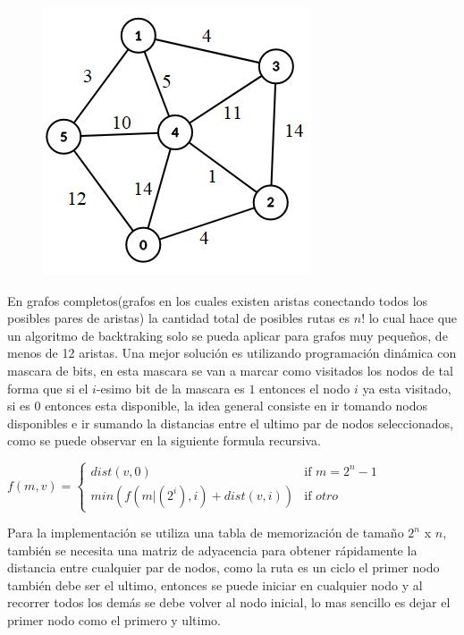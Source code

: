\documentclass[12pt, a4paper]{article}
\begin{document}
	\begin{figure}[!htb]
		\centering
		\includegraphics[scale=0.9]{Programacion_dinamica/imagenes/TSP/ejemplo}
		\caption{}
		\label{dp:TSP:ejemplo}
	\end{figure}
	
	En grafos completos(grafos en los cuales existen aristas conectando todos los posibles pares de aristas) 
	la cantidad total de posibles rutas es $n!$ lo cual hace que un algoritmo de backtraking solo se pueda aplicar
	para grafos muy pequeños, de menos de 12 aristas. Una mejor solución es utilizando programación dinámica con
	mascara de bits, en esta mascara se van a marcar como visitados los nodos de tal forma que si el $i$-esimo bit 
	de la mascara es $1$ entonces el nodo $i$ ya esta visitado, si es $0$ entonces esta disponible, la idea general  
	consiste en ir tomando nodos disponibles e ir sumando la distancias entre el ultimo par de nodos seleccionados, 
	como se puede observar en la siguiente formula recursiva.
	
	\begin{center}
		$f(m, v) = 	
		\begin{cases}
			dist(v, 0) & \text{if } m = 2^{n}-1\\
			min(f(m|(2^{i}), i) + dist(v, i)) & \text{if $otro$}
		\end{cases}
		$\\
	\end{center}
	
	Para la implementación se utiliza una tabla de memorización de tamaño $2^{n}$ x $n$, también se necesita una
	matriz de adyacencia para obtener rápidamente la distancia entre cualquier par de nodos, como la ruta es un ciclo 
	el primer nodo también debe ser el ultimo, entonces se puede iniciar en cualquier nodo y al recorrer todos los  
	demás se debe volver al nodo inicial, lo mas sencillo es dejar el primer nodo como el primero y ultimo.\\
	
\end{document}
